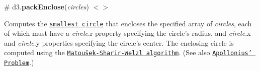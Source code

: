 \label{_packEnclose}%
\# d3.{\bfseries pack\+Enclose}({\itshape circles}) \href{https://github.com/d3/d3-hierarchy/blob/master/src/pack/enclose.js}{\tt $<$$>$}

Computes the \href{https://en.wikipedia.org/wiki/Smallest-circle_problem}{\tt smallest circle} that encloses the specified array of {\itshape circles}, each of which must have a {\itshape circle}.r property specifying the circle’s radius, and {\itshape circle}.x and {\itshape circle}.y properties specifying the circle’s center. The enclosing circle is computed using the \href{http://www.inf.ethz.ch/personal/emo/PublFiles/SubexLinProg_ALG16_96.pdf}{\tt Matoušek-\/\+Sharir-\/\+Welzl algorithm}. (See also \href{https://bl.ocks.org/mbostock/751fdd637f4bc2e3f08b}{\tt Apollonius’ Problem}.) 